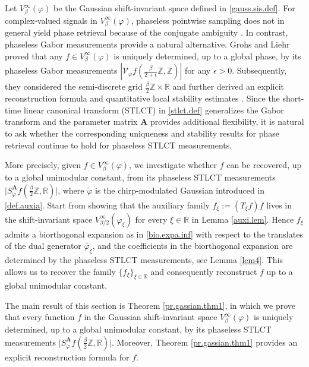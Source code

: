 \documentclass[11pt, reqno]{amsart}
\newcommand{\Z}{\mathbb{Z}}
\newcommand{\R}{\mathbb{R}}
\numberwithin{equation}{section}
\begin{document}
\medskip 

Let $V_{\beta}^{\infty}(\varphi)$ be the Gaussian shift-invariant space defined in \eqref{gauss.sis.def}. For complex-valued signals in $V_{\beta}^{\infty}(\varphi)$, phaseless pointwise sampling does not in general yield phase retrieval because of the conjugate ambiguity \cite{chen2024conjugate,chen2022phase, grochenig2020phase}. In contrast, phaseless Gabor measurements provide a natural alternative. Grohs and Liehr \cite{grohs2023injectivity} proved that any $f \in V_{\beta}^{\infty}(\varphi)$ is uniquely determined, up to a global phase, by its phaseless Gabor measurements $|\mathcal{V}_{\varphi} f(\frac{\beta}{2+\epsilon}\Z, \Z)|$ for any $\epsilon > 0$. Subsequently, they considered the semi-discrete grid $\frac{\beta}{2}\Z \times \R$ and further derived an explicit reconstruction formula and quantitative local stability estimates \cite{grohs2024stable}.  Since the short-time linear canonical transform (STLCT) in \eqref{stlct.def} generalizes the Gabor transform and the parameter matrix $\mathbf{A}$ provides additional flexibility, it is natural to ask whether the corresponding uniqueness and stability results for phase retrieval continue to hold for phaseless STLCT measurements.


More precisely, given $f\in V_{\beta}^{\infty}(\varphi)$, we investigate  whether $f$ can be recovered, up to a global unimodular constant, from its phaseless STLCT measurements $\bigl|S_{\check{\varphi}}^{\mathbf A}f(\tfrac{\beta}{2}\mathbb Z,\mathbb R)\bigr|$,  where $\check{\varphi}$ is the chirp-modulated Gaussian introduced in \eqref{def.auxia}. Start from showing that  the auxiliary family $
f_\xi:=(T_\xi f)\overline f$ lives in the shift-invariant space $V_{\beta/2}^{\infty}(\varphi_\xi)$ for every $\xi\in\mathbb R$ in Lemma \ref{auxi.lem}. Hence $f_\xi$ admits a biorthogonal expansion as in \eqref{bio.expa.inf} with respect to the translates of the dual generator $\widetilde{\varphi_\xi}$, and the coefficients in the biorthogonal expansion are determined by the phaseless STLCT measurements, see Lemma \ref{lem4}. This allows us to recover the family $\{f_\xi \}_{\xi \in\mathbb R}$ and consequently reconstruct $f$ up to a global unimodular constant. 

The main result of this section is Theorem \ref{pr.gassian.thm1}, in which we prove that every function $f$  in the Gaussian shift-invariant space $V_{\beta}^{\infty}(\varphi)$ is uniquely determined, up to a global unimodular constant, by its phaseless STLCT measurements $
\bigl|S_{\check{\varphi}}^{\mathbf A}f(\tfrac{\beta}{2}\mathbb Z,\mathbb R)\bigr|$. Moreover, Theorem \ref{pr.gassian.thm1} provides an explicit reconstruction formula for $f$.
\end{document}
